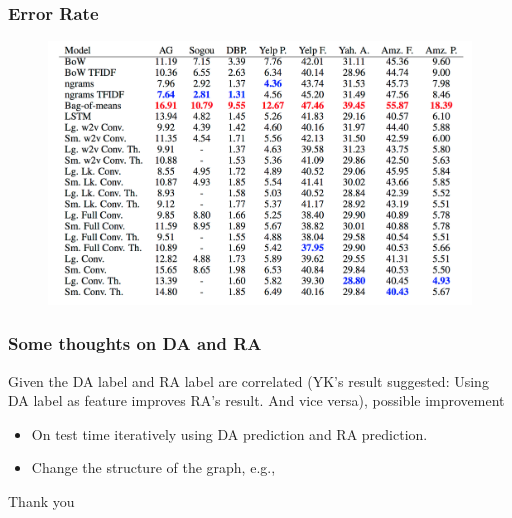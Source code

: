\documentclass{beamer}
\begin{document}
\begin{frame}
\frametitle{Error Rate}
\begin{figure}
\includegraphics[scale=0.3]{error_rate}
\end{figure}
\end{frame}

\begin{frame}
\frametitle{Some thoughts on DA and RA}
Given the DA label and RA label are correlated (YK's result suggested: Using DA label as feature improves RA's result. And vice versa), possible improvement 
\begin{itemize}
\item On test time iteratively using DA prediction and RA prediction. 
\item Change the structure of the graph, e.g.,  
\end{itemize}

\end{frame}




\begin{frame}
\center
\huge Thank you

\end{frame}
\end{document}

